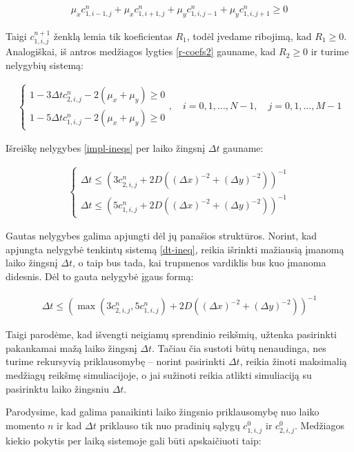 \begin{align*}
    \mu_xc^n_{1,i-1,j}+\mu_xc^n_{1,i+1,j}+\mu_yc^n_{1,i,j-1}+\mu_yc^n_{1,i,j+1}\geqslant 0
\end{align*}

Taigi $c^{n+1}_{1,i,j}$ ženklą lemia tik koeficientas $R_1$, todėl įvedame ribojimą, kad $R_1\geqslant 0$. Analogiškai, iš antros medžiagos lygties \eqref{r-coefs2} gauname, kad $R_2\geqslant 0$ ir turime nelygybių sistemą:

\begin{align} \label{impl-ineqs}
  \begin{cases}
    1-3\Delta tc^{n}_{2,i,j}-2(\mu_x+\mu_y)\geqslant 0\\
    1-5\Delta tc^{n}_{1,i,j}-2(\mu_x+\mu_y)\geqslant 0
  \end{cases}, \quad i=0,1,\dots,N-1, \quad j=0,1,\dots,M-1
\end{align}

Išreiškę nelygybes \eqref{impl-ineqs} per laiko žingsnį $\Delta t$ gauname:

\begin{align} \label{dt-ineq}
  \begin{cases}
    \Delta t \leqslant (3c^{n}_{2,i,j}+2D((\Delta x)^{-2}+(\Delta y)^{-2}))^{-1}\\
    \Delta t \leqslant (5c^{n}_{1,i,j}+2D((\Delta x)^{-2}+(\Delta y)^{-2}))^{-1}
  \end{cases}
\end{align}

Gautas nelygybes galima apjungti dėl jų panašios struktūros. Norint, kad apjungta nelygybė tenkintų sistemą \eqref{dt-ineq}, reikia išrinkti mažiausią įmanomą laiko žingsnį $\Delta t$, o taip bus tada, kai trupmenos vardiklis bus kuo įmanoma didesnis. Dėl to gauta nelygybė įgaus formą:

\begin{align}
  \Delta t \leqslant \left(\max(3c^{n}_{2,i,j}, 5c^{n}_{1,i,j})+2D\left((\Delta x)^{-2}+(\Delta y)^{-2}\right)\right)^{-1}
\end{align}

Taigi parodėme, kad išvengti neigiamų sprendinio reikšmių, užtenka pasirinkti pakankamai mažą laiko žingsnį $\Delta t$. Tačiau čia sustoti būtų nenaudinga, nes turime rekursyvią priklausomybę -- norint pasirinkti $\Delta t$, reikia žinoti maksimalią medžiagų reikšmę simuliacijoje, o jai sužinoti reikia atlikti simuliaciją su pasirinktu laiko žingsniu $\Delta t$.

Parodysime, kad galima panaikinti laiko žingsnio priklausomybę nuo laiko momento $n$ ir kad $\Delta t$ priklauso tik nuo pradinių sąlygų $c^0_{1,i,j}$ ir $c^0_{2,i,j}$. Medžiagos kiekio pokytis per laiką sistemoje gali būti apskaičiuoti taip:

